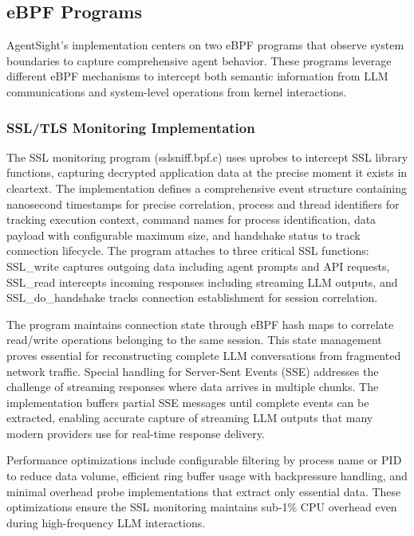 \subsection{eBPF Programs}

AgentSight's implementation centers on two eBPF programs that observe system boundaries to capture comprehensive agent behavior. These programs leverage different eBPF mechanisms to intercept both semantic information from LLM communications and system-level operations from kernel interactions.

\subsubsection{SSL/TLS Monitoring Implementation}

The SSL monitoring program (sslsniff.bpf.c) uses uprobes to intercept SSL library functions, capturing decrypted application data at the precise moment it exists in cleartext. The implementation defines a comprehensive event structure containing nanosecond timestamps for precise correlation, process and thread identifiers for tracking execution context, command names for process identification, data payload with configurable maximum size, and handshake status to track connection lifecycle. The program attaches to three critical SSL functions: SSL\_write captures outgoing data including agent prompts and API requests, SSL\_read intercepts incoming responses including streaming LLM outputs, and SSL\_do\_handshake tracks connection establishment for session correlation.

The program maintains connection state through eBPF hash maps to correlate read/write operations belonging to the same session. This state management proves essential for reconstructing complete LLM conversations from fragmented network traffic. Special handling for Server-Sent Events (SSE) addresses the challenge of streaming responses where data arrives in multiple chunks. The implementation buffers partial SSE messages until complete events can be extracted, enabling accurate capture of streaming LLM outputs that many modern providers use for real-time response delivery.

Performance optimizations include configurable filtering by process name or PID to reduce data volume, efficient ring buffer usage with backpressure handling, and minimal overhead probe implementations that extract only essential data. These optimizations ensure the SSL monitoring maintains sub-1\% CPU overhead even during high-frequency LLM interactions.


